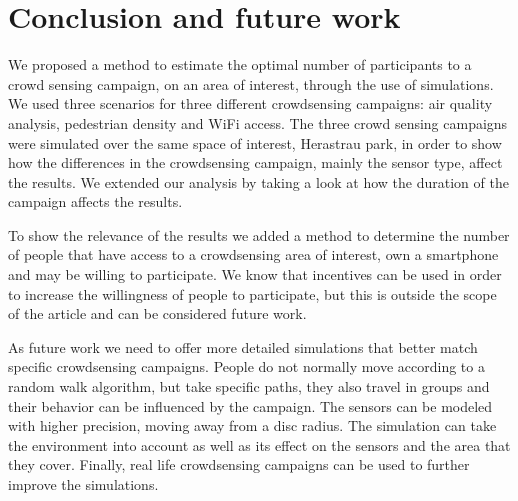 \chapter{Conclusion and future work}
\label{chapter:conclusion}

We proposed a method to estimate the optimal number of participants to a crowd sensing campaign, on an area of interest, through the use of simulations. We used three scenarios for three different crowdsensing campaigns: air quality analysis, pedestrian density and WiFi access. The three crowd sensing campaigns were simulated over the same space of interest, Herastrau park, in order to show how the differences in the crowdsensing campaign, mainly the sensor type, affect the results. We extended our analysis by taking a look at how the duration of the campaign affects the results.

To show the relevance of the results we added a method to determine the number of people that have access to a crowdsensing area of interest, own a smartphone and may be willing to participate. We know that incentives can be used in order to increase the willingness of people to participate, but this is outside the scope of the article and can be considered future work.

As future work we need to offer more detailed simulations that better match specific crowdsensing campaigns. People do not normally move according to a random walk algorithm, but take specific paths, they also travel in groups and their behavior can be influenced by the campaign. The sensors can be modeled with higher precision, moving away from a disc radius. The simulation can take the environment into account as well as its effect on the sensors and the area that they cover. Finally, real life crowdsensing campaigns can be used to further improve the simulations.
